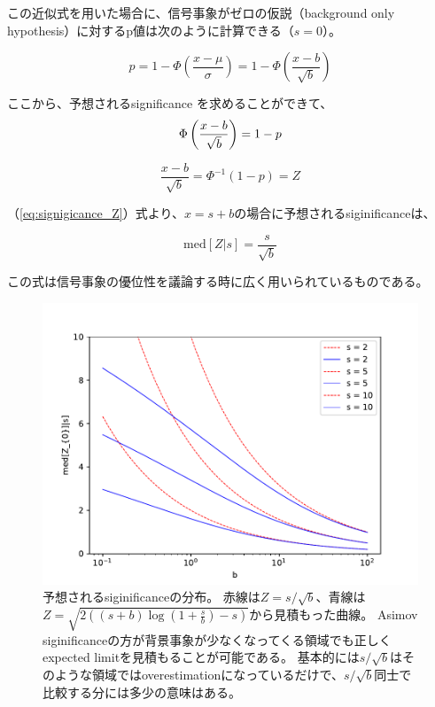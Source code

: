 \documentclass[oneside, uplatex]{jsbook}
\begin{document}
この近似式を用いた場合に、信号事象がゼロの仮説（background only hypothesis）に対するp値は次のように計算できる（$s=0$）。

\begin{equation}
  p = 1 - \Phi \left(\frac{x-\mu}{\sigma} \right) = 1 - \Phi \left(\frac{x-b}{\sqrt{b}} \right)
\end{equation}

ここから、予想されるsignificance を求めることができて、
\begin{equation}
  \Phi \left(\frac{x-b}{\sqrt{b}} \right) = 1-p \\
\end{equation}

\begin{equation}\label{eq:signigicance_Z}
  \frac{x-b}{\sqrt{b}} = \Phi^{-1} (1-p) = Z
\end{equation}

（\ref{eq:signigicance_Z}）式より、$x=s+b$の場合に予想されるsiginificanceは、

\begin{equation}
  \mathrm{med}[Z|s] = \frac{s}{\sqrt{b}}
\end{equation}

この式は信号事象の優位性を議論する時に広く用いられているものである。

\begin{figure}[h]
  \centering
  \includegraphics[scale=0.8]{python/discovery_significance.pdf}
  \caption{予想されるsiginificanceの分布。
  赤線は$Z=s/\sqrt{b}$、青線は$Z=\sqrt{2\left((s+b)\log\left({1+\frac{s}{b}}\right)-s\right)}$から見積もった曲線。
  Asimov siginificanceの方が背景事象が少なくなってくる領域でも正しくexpected limitを見積もることが可能である。
  基本的には$s/\sqrt{b}$はそのような領域ではoverestimationになっているだけで、$s/\sqrt{b}$同士で比較する分には多少の意味はある。
  }
\end{figure}
\end{document}
